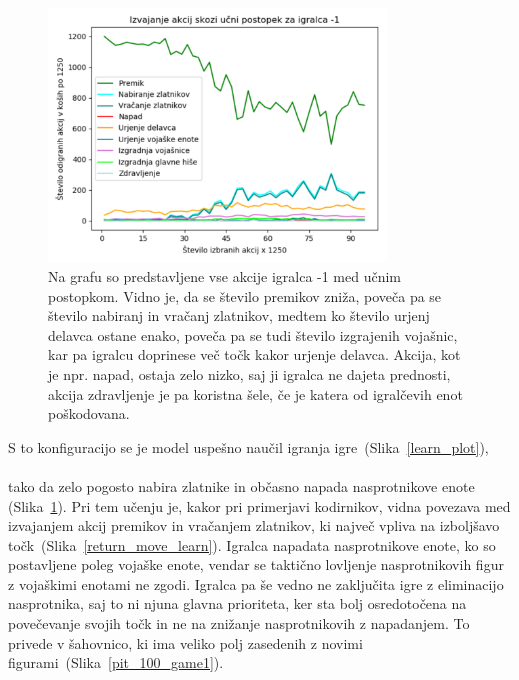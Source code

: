 \documentclass[a4paper, 12pt]{book}
\begin{document}
{\begin{figure}[h!]
	\begin{center}
		\includegraphics[width=0.8\textwidth]{photos/all_acts_playerminus1.pdf}
	\end{center}
	\caption{Na grafu so predstavljene vse akcije igralca -1 med učnim postopkom.
		Vidno je, da se število premikov zniža, poveča pa se število nabiranj in vračanj zlatnikov, medtem ko število urjenj delavca ostane enako, poveča pa se tudi število izgrajenih vojašnic, kar pa igralcu doprinese več točk kakor urjenje delavca.
		Akcija, kot je npr. napad, ostaja zelo nizko, saj ji igralca ne dajeta prednosti, akcija zdravljenje je pa koristna šele, če je katera od igralčevih enot poškodovana. }
	\label{all_acts_playerminus1}
\end{figure}

S to konfiguracijo se je model uspešno naučil igranja igre~(Slika~\ref{learn_plot}),\\\\tako da zelo pogosto nabira zlatnike in občasno napada nasprotnikove enote (Slika~\ref{all_acts_playerminus1}).
Pri tem učenju je, kakor pri primerjavi kodirnikov, vidna povezava med izvajanjem akcij premikov in vračanjem zlatnikov, ki največ vpliva na izboljšavo točk~(Slika~\ref{return_move_learn}).
Igralca napadata nasprotnikove enote, ko so postavljene poleg vojaške enote, vendar se taktično lovljenje nasprotnikovih figur z vojaškimi enotami ne zgodi.
Igralca pa še vedno ne zaključita igre z eliminacijo nasprotnika, saj to ni njuna glavna prioriteta, ker sta bolj osredotočena na povečevanje svojih točk in ne na znižanje nasprotnikovih z napadanjem.
To privede v šahovnico, ki ima veliko polj zasedenih z novimi figurami~(Slika~\ref{pit_100_game1}).

}
\end{document}

